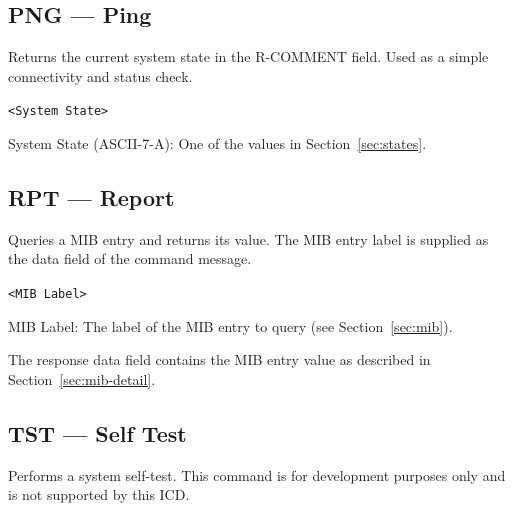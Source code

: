 \subsection{PNG --- Ping}
\label{cmd:png}
\begin{description}[style=nextline]
    \item[Description:]
        Returns the current system state in the R-COMMENT field.  Used as a
        simple connectivity and status check.
    \item[Response Format:] \texttt{<System State>}
    \item[Response Element:]
        System State (ASCII-7-A): One of the values in
        Section~\ref{sec:states}.
\end{description}

\subsection{RPT --- Report}
\label{cmd:rpt}
\begin{description}[style=nextline]
    \item[Description:]
        Queries a MIB entry and returns its value.  The MIB entry label is
        supplied as the data field of the command message.
    \item[Argument Format:] \texttt{<MIB Label>}
    \item[Argument:]
        MIB Label: The label of the MIB entry to query (see
        Section~\ref{sec:mib}).
    \item[Response:]
        The response data field contains the MIB entry value as described in
        Section~\ref{sec:mib-detail}.
\end{description}

\subsection{TST --- Self Test}
\label{cmd:tst}
\begin{description}[style=nextline]
    \item[Description:]
        Performs a system self-test.  This command is for development purposes
        only and is not supported by this ICD.
\end{description}



